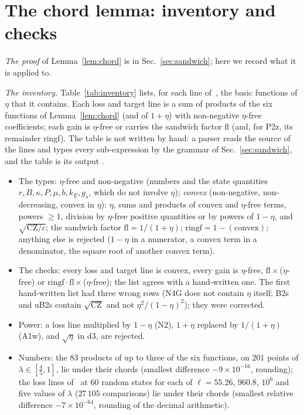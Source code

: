 \section{The chord lemma: inventory and checks}
\label{app:A}

\emph{The proof} of Lemma~\ref{lem:chord} is in Sec.~\ref{sec:sandwich}; here we record what it is applied to.

\emph{The inventory.}
Table~\ref{tab:inventory} lists, for each line of~\cite{I}, the basic functions of $\eta$ that it contains.
Each loss and target line is a sum of products of the six functions of Lemma~\ref{lem:chord} (and of $1+\eta$) with non-negative $\eta$-free coefficients; each gain is $\eta$-free or carries the sandwich factor fl (and, for P2z, its remainder ringf).
The table is not written by hand: a parser reads the source of the lines and types every sub-expression by the grammar of Sec.~\ref{sec:sandwich}, and the table is its output .
\begin{itemize}
\item The types: $\eta$-free and non-negative (numbers and the state quantities $r,B,\kappa,P,\mu,b,k_E,g_s$, which do not involve $\eta$); \emph{convex} (non-negative, non-decreasing, convex in $\eta$): $\eta$, sums and products of convex and $\eta$-free terms, powers $\ge1$, division by $\eta$-free positive quantities or by powers of $1-\eta$, and $\sqrt{\mathrm{CZ}/c}$; the sandwich factor $\mathrm{fl}=1/(1+\eta)$; $\mathrm{ringf}=1-(\text{convex})$; anything else is rejected ($1-\eta$ in a numerator, a convex term in a denominator, the square root of another convex term).
\item The checks: every loss and target line is convex, every gain is $\eta$-free, $\mathrm{fl}\times$($\eta$-free) or $\mathrm{ringf}\cdot\mathrm{fl}\times$($\eta$-free); the list agrees with a hand-written one. The first hand-written list had three wrong rows (N4G does not contain $\eta$ itself; B2s and uB2s contain $\sqrt{\mathrm{CZ}}$ and not $\eta^2/(1-\eta)^2$); they were corrected.
\item Power: a loss line multiplied by $1-\eta$ (N2), $1+\eta$ replaced by $1/(1+\eta)$ (A1w), and $\sqrt\eta$ in d3, are rejected.
\item Numbers: the $83$ products of up to three of the six functions, on $201$ points of $\lambda\in[\tfrac45,1]$, lie under their chords (smallest difference $-9\times10^{-16}$, rounding); the loss lines of~\cite{I} at $60$ random states for each of $\ell=55.26$, $960.8$, $10^6$ and five values of $\lambda$ ($27\,105$ comparisons) lie under their chords (smallest relative difference $-7\times10^{-64}$, rounding of the decimal arithmetic).
\end{itemize}

